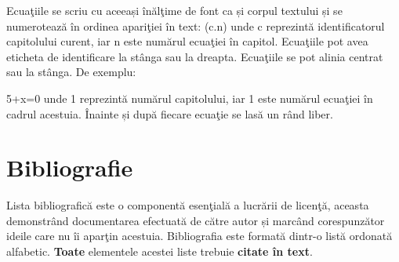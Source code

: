 	Ecuaţiile se scriu cu aceeași înălţime de font ca și corpul textului și se numerotează în ordinea apariţiei în text: (c.n) unde c reprezintă identificatorul capitolului curent, iar n este numărul ecuaţiei în capitol. Ecuaţiile pot avea eticheta de identificare la stânga sau la dreapta. Ecuaţiile se pot alinia centrat sau la stânga. De exemplu:

\be
\label{eq:test}
5+x=0
\ee
unde 1 reprezintă numărul capitolului, iar 1 este numărul ecuaţiei în cadrul acestuia. Înainte și după fiecare ecuaţie se lasă un rând liber.


\section{Bibliografie}

	Lista bibliografică este o componentă esenţială a lucrării de licenţă, aceasta demonstrând documentarea efectuată de către autor și marcând corespunzător ideile care nu îi aparţin acestuia. Bibliografia este formată dintr-o listă ordonată alfabetic. \textbf{Toate} elementele acestei liste trebuie \textbf{citate în text}.



